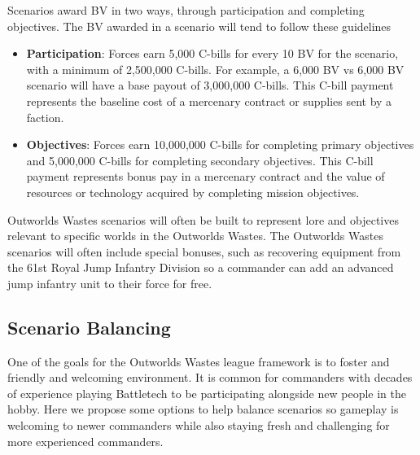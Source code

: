 \documentclass[UTF8]{article}
\begin{document}
Scenarios award BV in two ways, through participation and completing objectives.
The BV awarded in a scenario will tend to follow these guidelines

\begin{itemize}

\item {\bf Participation}: Forces earn 5,000 C-bills for every 10 BV for the scenario, with a minimum of 2,500,000 C-bills.
For example, a 6,000 BV vs 6,000 BV scenario will have a base payout of 3,000,000 C-bills.
This C-bill payment represents the baseline cost of a mercenary contract or supplies sent by a faction.

\item {\bf Objectives}: Forces earn 10,000,000 C-bills for completing primary objectives and 5,000,000 C-bills for completing secondary objectives.
This C-bill payment represents bonus pay in a mercenary contract and the value of resources or technology acquired by completing mission objectives.

\end{itemize}

Outworlds Wastes scenarios will often be built to represent lore and objectives relevant to specific worlds in the Outworlds Wastes.
The Outworlds Wastes scenarios will often include special bonuses, such as recovering equipment from the 61st Royal Jump Infantry Division so a commander can add an advanced jump infantry unit to their force for free.\\

\subsection{Scenario Balancing}

One of the goals for the Outworlds Wastes league framework is to foster and friendly and welcoming environment.
It is common for commanders with decades of experience playing Battletech to be participating alongside new people in the hobby.
Here we propose some options to help balance scenarios so gameplay is welcoming to newer commanders while also staying fresh and challenging for more experienced commanders.\\
\end{document}
